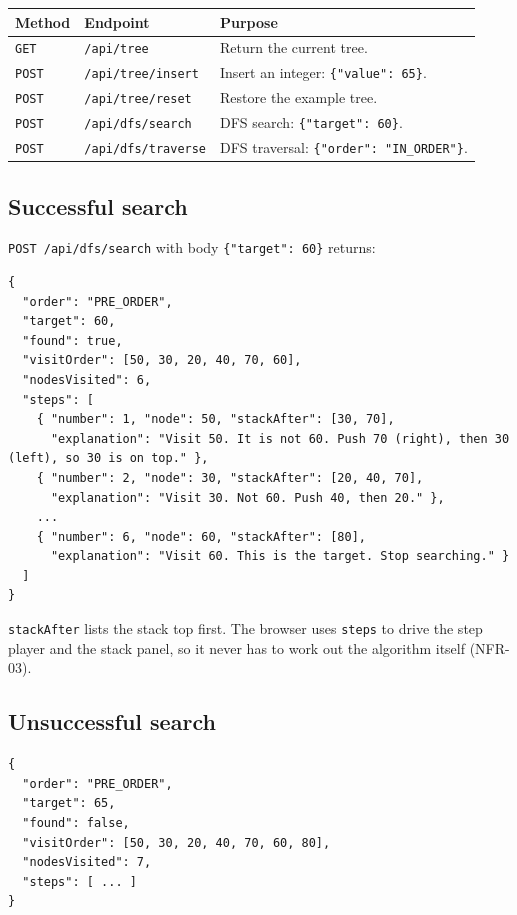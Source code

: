\documentclass[11pt,a4paper]{article}
\newcommand{\code}[1]{\texttt{#1}}
\begin{document}
\begin{tabularx}{\textwidth}{@{}l l L@{}}
  \toprule
  \textbf{Method} & \textbf{Endpoint} & \textbf{Purpose} \\
  \midrule
  \code{GET}  & \code{/api/tree}          & Return the current tree. \\
  \code{POST} & \code{/api/tree/insert}   & Insert an integer: \code{\{"value": 65\}}. \\
  \code{POST} & \code{/api/tree/reset}    & Restore the example tree. \\
  \code{POST} & \code{/api/dfs/search}    & DFS search: \code{\{"target": 60\}}. \\
  \code{POST} & \code{/api/dfs/traverse}  & DFS traversal: \code{\{"order": "IN\_ORDER"\}}. \\
  \bottomrule
\end{tabularx}

\subsection{Successful search}

\code{POST /api/dfs/search} with body \code{\{"target": 60\}} returns:

\begin{lstlisting}[style=json]
{
  "order": "PRE_ORDER",
  "target": 60,
  "found": true,
  "visitOrder": [50, 30, 20, 40, 70, 60],
  "nodesVisited": 6,
  "steps": [
    { "number": 1, "node": 50, "stackAfter": [30, 70],
      "explanation": "Visit 50. It is not 60. Push 70 (right), then 30 (left), so 30 is on top." },
    { "number": 2, "node": 30, "stackAfter": [20, 40, 70],
      "explanation": "Visit 30. Not 60. Push 40, then 20." },
    ...
    { "number": 6, "node": 60, "stackAfter": [80],
      "explanation": "Visit 60. This is the target. Stop searching." }
  ]
}
\end{lstlisting}

\code{stackAfter} lists the stack top first. The browser uses \code{steps} to drive the step
player and the stack panel, so it never has to work out the algorithm itself (NFR-03).

\subsection{Unsuccessful search}

\begin{lstlisting}[style=json]
{
  "order": "PRE_ORDER",
  "target": 65,
  "found": false,
  "visitOrder": [50, 30, 20, 40, 70, 60, 80],
  "nodesVisited": 7,
  "steps": [ ... ]
}
\end{lstlisting}
\end{document}
